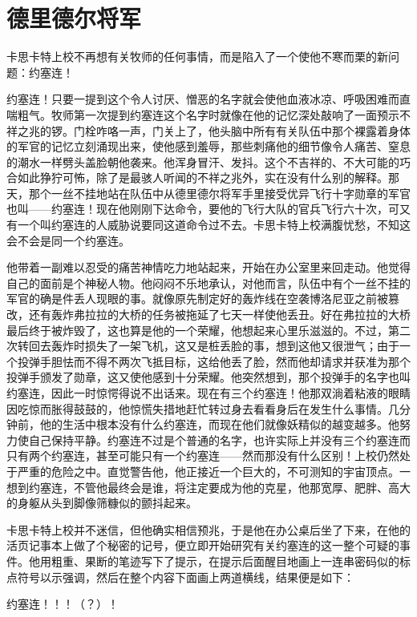\chapter{德里德尔将军}
 
    卡思卡特上校不再想有关牧师的任何事情，而是陷入了一个使他不寒而栗的新问题：约塞连！

    约塞连！只要一提到这个令人讨厌、憎恶的名字就会使他血液冰凉、呼吸困难而直喘粗气。牧师第一次提到约塞连这个名字时就像在他的记忆深处敲响了一面预示不祥之兆的锣。门栓咋咯一声，门关上了，他头脑中所有有关队伍中那个裸露着身体的军官的记忆立刻涌现出来，使他感到羞辱，那些刺痛他的细节像令人痛苦、窒息的潮水一样劈头盖脸朝他袭来。他浑身冒汗、发抖。这个不吉祥的、不大可能的巧合如此狰狞可怖，除了是最骇人听闻的不祥之兆外，实在没有什么别的解释。那天，那个一丝不挂地站在队伍中从德里德尔将军手里接受优异飞行十字勋章的军官也叫——约塞连！现在他刚刚下达命令，要他的飞行大队的官兵飞行六十次，可又有一个叫约塞连的人威胁说要同这道命令过不去。卡思卡特上校满腹忧愁，不知这会不会是同一个约塞连。

    他带着一副难以忍受的痛苦神情吃力地站起来，开始在办公室里来回走动。他觉得自己的面前是个神秘人物。他闷闷不乐地承认，对他而言，队伍中有个一丝不挂的军官的确是件丢人现眼的事。就像原先制定好的轰炸线在空袭博洛尼亚之前被篡改，还有轰炸弗拉拉的大桥的任务被拖延了七天一样使他丢丑。好在弗拉拉的大桥最后终于被炸毁了，这也算是他的一个荣耀，他想起来心里乐滋滋的。不过，第二次转回去轰炸时损失了一架飞机，这又是桩丢脸的事，想到这他又很泄气；由于一个投弹手胆怯而不得不两次飞抵目标，这给他丢了脸，然而他却请求并获准为那个投弹手颁发了勋章，这又使他感到十分荣耀。他突然想到，那个投弹手的名字也叫约塞连，因此一时惊愕得说不出话来。现在有三个约塞连！他那双淌着粘液的眼睛因吃惊而胀得鼓鼓的，他惊慌失措地赶忙转过身去看看身后在发生什么事情。几分钟前，他的生活中根本没有什么约塞连，而现在他们就像妖精似的越变越多。他努力使自己保持平静。约塞连不过是个普通的名字，也许实际上并没有三个约塞连而只有两个约塞连，甚至可能只有一个约塞连——然而那没有什么区别！上校仍然处于严重的危险之中。直觉警告他，他正接近一个巨大的，不可测知的宇宙顶点。一想到约塞连，不管他最终会是谁，将注定要成为他的克星，他那宽厚、肥胖、高大的身躯从头到脚像筛糠似的颤抖起来。

    卡思卡特上校并不迷信，但他确实相信预兆，于是他在办公桌后坐了下来，在他的活页记事本上做了个秘密的记号，便立即开始研究有关约塞连的这一整个可疑的事件。他用粗重、果断的笔迹写下了提示，在提示后面醒目地画上一连串密码似的标点符号以示强调，然后在整个内容下面画上两道横线，结果便是如下：

    约塞连！！！（？）！


